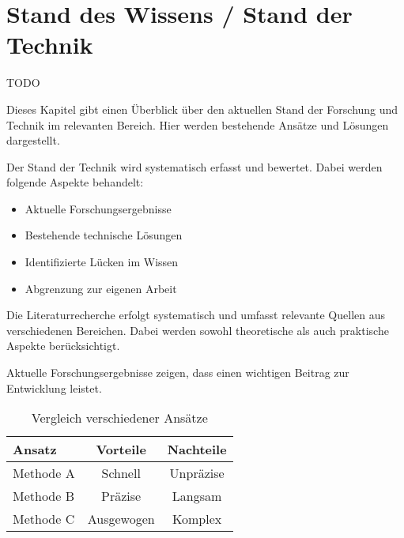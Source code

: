 
\chapter{Stand des Wissens / Stand der Technik}\label{cha:relatedWork}

TODO

Dieses Kapitel gibt einen Überblick über den aktuellen Stand der Forschung und Technik im relevanten Bereich. 
Hier werden bestehende Ansätze und Lösungen dargestellt.

Der Stand der Technik wird systematisch erfasst und bewertet. Dabei werden folgende Aspekte behandelt:

\begin{itemize}[leftmargin=0.63cm, label=\textbullet]
    \item Aktuelle Forschungsergebnisse
    \item Bestehende technische Lösungen
    \item Identifizierte Lücken im Wissen
    \item Abgrenzung zur eigenen Arbeit
\end{itemize}

Die Literaturrecherche erfolgt systematisch und umfasst relevante Quellen aus verschiedenen Bereichen. 
Dabei werden sowohl theoretische als auch praktische Aspekte berücksichtigt.

Aktuelle Forschungsergebnisse zeigen, dass \cite{mustermann2023} einen wichtigen Beitrag zur Entwicklung leistet.

\begin{table}[htbp]
    \centering
    \caption{Vergleich verschiedener Ansätze}
    \label{tab:vergleich}
        \begin{tabular}{lcc}
        \toprule
        Ansatz & Vorteile & Nachteile \\
        \midrule
        Methode A & Schnell & Unpräzise \\
        Methode B & Präzise & Langsam \\
        Methode C & Ausgewogen & Komplex \\
        \bottomrule
        \end{tabular}
\end{table}

